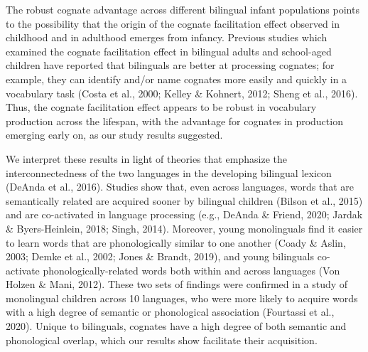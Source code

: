 \documentclass[
  english,
  ,man,floatsintext]{apa6}
\begin{document}
The robust cognate advantage across different bilingual infant populations points to the possibility that the origin of the cognate facilitation effect observed in childhood and in adulthood emerges from infancy. Previous studies which examined the cognate facilitation effect in bilingual adults and school-aged children have reported that bilinguals are better at processing cognates; for example, they can identify and/or name cognates more easily and quickly in a vocabulary task (Costa et al., 2000; Kelley \& Kohnert, 2012; Sheng et al., 2016). Thus, the cognate facilitation effect appears to be robust in vocabulary production across the lifespan, with the advantage for cognates in production emerging early on, as our study results suggested.

We interpret these results in light of theories that emphasize the interconnectedness of the two languages in the developing bilingual lexicon (DeAnda et al., 2016). Studies show that, even across languages, words that are semantically related are acquired sooner by bilingual children (Bilson et al., 2015) and are co-activated in language processing (e.g., DeAnda \& Friend, 2020; Jardak \& Byers-Heinlein, 2018; Singh, 2014). Moreover, young monolinguals find it easier to learn words that are phonologically similar to one another (Coady \& Aslin, 2003; Demke et al., 2002; Jones \& Brandt, 2019), and young bilinguals co-activate phonologically-related words both within and across languages (Von Holzen \& Mani, 2012). These two sets of findings were confirmed in a study of monolingual children across 10 languages, who were more likely to acquire words with a high degree of semantic or phonological association (Fourtassi et al., 2020). Unique to bilinguals, cognates have a high degree of both semantic and phonological overlap, which our results show facilitate their acquisition.
\end{document}
